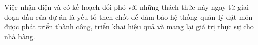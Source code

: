 \begin{enumerate}

\end{enumerate}

Việc nhận diện và có kế hoạch đối phó với những thách thức này ngay từ giai đoạn đầu của dự án là yếu tố then chốt để đảm bảo hệ thống quản lý đặt món được phát triển thành công, triển khai hiệu quả và mang lại giá trị thực sự cho nhà hàng.
